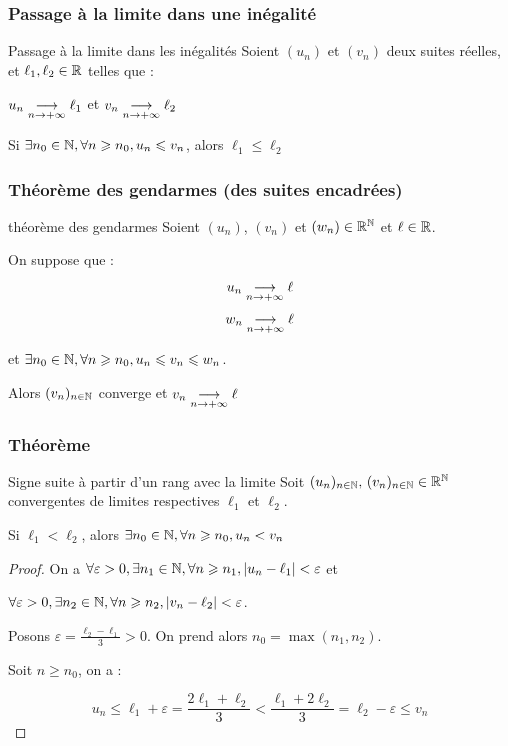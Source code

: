 \subsubsection{Passage à la limite dans une inégalité}

\begin{theoreme}{Passage à la limite dans les inégalités}{}
    Soient $(u_n)$ et $(v_n)$ deux suites réelles, et $\ell_1, \ell_2 \in \mathbb{R}$ telles que :

    $ u_n \underset{n \to +\infty}{\longrightarrow} \ell_1$ et $v_n \underset{n \to +\infty}{\longrightarrow} \ell_2$

    Si $\exists n_0 \in \mathbb{N}, \forall n \geqslant n_0, u_n \leqslant v_n$, alors $\ell_1 \leqslant \ell_2$
\end{theoreme}

\subsubsection{Théorème des gendarmes (des suites encadrées)}

\begin{theoreme}{théorème des gendarmes}{}
    Soient $(u_n)$, $(v_n)$ et $(w_n) \in \mathbb{R}^{\mathbb{N}}$ et $\ell \in \mathbb{R}$. 
    
    On suppose que : 
    $$u_n \underset{n \to +\infty}{\longrightarrow} \ell$$
    $$w_n \underset{n \to +\infty}{\longrightarrow} \ell$$

    et $\exists n_0 \in \mathbb{N}, \forall n \geqslant n_0, u_n \leqslant v_n \leqslant w_n$. 

    Alors $(v_n)_{n \in \mathbb{N}}$ converge et $v_n \underset{n \to +\infty}{\longrightarrow} \ell$
    
\end{theoreme}

\subsubsection{Théorème }

\begin{theorement}{Signe suite à partir d'un rang avec la limite}{}
    Soit $(u_n)_{n \in \mathbb{N}}, \, (v_n)_{n \in \mathbb{N}} \in \mathbb{R}^{\mathbb{N}}$ convergentes de limites 
    respectives $\ell_1$ et $\ell_2$.

    Si $\ell_1 < \ell_2$, alors $\exists n_0 \in \mathbb{N}, \forall n \geqslant n_0, u_n < v_n$
\end{theorement}


\begin{proof}
    On a $\forall \varepsilon > 0, \exists n_1 \in \mathbb{N}, \forall n \geqslant n_1, |u_n - \ell_1| < \varepsilon$ et

    $\forall \varepsilon > 0, \exists n_2 \in \mathbb{N}, \forall n \geqslant n_2, |v_n - \ell_2| < \varepsilon$.

    Posons $\displaystyle \varepsilon = \frac{\ell_2 - \ell_1} 3 > 0$. On prend alors 
    $n_0 = \max(n_1, n_2)$.

    Soit $n \geqslant n_0$, on a :

    $$ u_n \leqslant \ell_1 + \varepsilon = \frac{2\ell_1 + \ell_2} 3 < \frac{\ell_1 + 2\ell_2}{3} = \ell_2 - \varepsilon \leqslant v_n$$

\end{proof}

